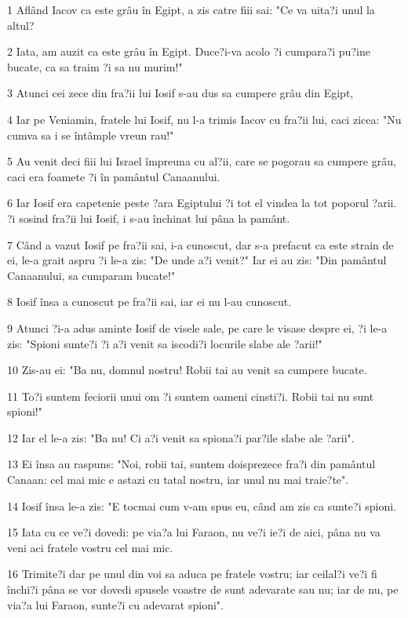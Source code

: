 \par 1 Aflând Iacov ca este grâu în Egipt, a zis catre fiii sai: "Ce va uita?i unul la altul?
\par 2 Iata, am auzit ca este grâu în Egipt. Duce?i-va acolo ?i cumpara?i pu?ine bucate, ca sa traim ?i sa nu murim!"
\par 3 Atunci cei zece din fra?ii lui Iosif s-au dus sa cumpere grâu din Egipt,
\par 4 Iar pe Veniamin, fratele lui Iosif, nu l-a trimis Iacov cu fra?ii lui, caci zicea: "Nu cumva sa i se întâmple vreun rau!"
\par 5 Au venit deci fiii lui Israel împreuna cu al?ii, care se pogorau sa cumpere grâu, caci era foamete ?i în pamântul Canaanului.
\par 6 Iar Iosif era capetenie peste ?ara Egiptului ?i tot el vindea la tot poporul ?arii. ?i sosind fra?ii lui Iosif, i s-au închinat lui pâna la pamânt.
\par 7 Când a vazut Iosif pe fra?ii sai, i-a cunoscut, dar s-a prefacut ca este strain de ei, le-a grait aspru ?i le-a zis: "De unde a?i venit?" Iar ei au zis: "Din pamântul Canaanului, sa cumparam bucate!"
\par 8 Iosif însa a cunoscut pe fra?ii sai, iar ei nu l-au cunoscut.
\par 9 Atunci ?i-a adus aminte Iosif de visele sale, pe care le visase despre ei, ?i le-a zis: "Spioni sunte?i ?i a?i venit sa iscodi?i locurile slabe ale ?arii!"
\par 10 Zis-au ei: "Ba nu, domnul nostru! Robii tai au venit sa cumpere bucate.
\par 11 To?i suntem feciorii unui om ?i suntem oameni cinsti?i. Robii tai nu sunt spioni!"
\par 12 Iar el le-a zis: "Ba nu! Ci a?i venit sa spiona?i par?ile slabe ale ?arii".
\par 13 Ei însa au raspuns: "Noi, robii tai, suntem doisprezece fra?i din pamântul Canaan: cel mai mic e astazi cu tatal nostru, iar unul nu mai traie?te".
\par 14 Iosif însa le-a zis: "E tocmai cum v-am spus eu, când am zis ca sunte?i spioni.
\par 15 Iata cu ce ve?i dovedi: pe via?a lui Faraon, nu ve?i ie?i de aici, pâna nu va veni aci fratele vostru cel mai mic.
\par 16 Trimite?i dar pe unul din voi sa aduca pe fratele vostru; iar ceilal?i ve?i fi închi?i pâna se vor dovedi spusele voastre de sunt adevarate sau nu; iar de nu, pe via?a lui Faraon, sunte?i cu adevarat spioni".
